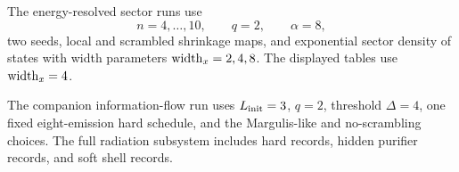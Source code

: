 \documentclass[aps,prd,onecolumn,longbibliography,nofootinbib]{revtex4-2}
\begin{document}
The energy-resolved sector runs use
\begin{equation}
    n=4,\ldots,10,\qquad q=2,\qquad \alpha=8,
\end{equation}
two seeds, local and scrambled shrinkage maps, and exponential sector density
of states with width parameters ${\rm width}_x=2,4,8$.  The displayed tables
use ${\rm width}_x=4$.

The companion information-flow run uses $L_{\rm init}=3$, $q=2$, threshold
$\Delta=4$, one fixed eight-emission hard schedule, and the Margulis-like and
no-scrambling choices.  The full radiation subsystem includes hard records,
hidden purifier records, and soft shell records.



\end{document}
